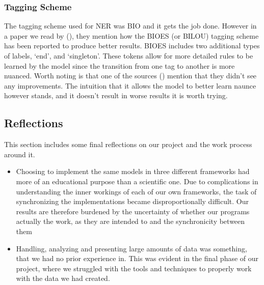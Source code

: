 \subsubsection{Tagging Scheme}

The tagging scheme used for NER was BIO and it gets the job done. However in a
paper we read by (\cite{ma2016endtoend}), they mention how the BIOES (or BILOU)
tagging scheme has been reported to produce better results. BIOES includes two
additional types of labels, `end', and `singleton'. These tokens allow for more
detailed rules to be learned by the model since the transition from one tag to
another is more nuanced. Worth noting is that one of the sources
(\cite{lample2016neural}) mention that they didn't see any improvements. The
intuition that it allows the model to better learn naunce however stands, and it
doesn't result in worse results it is worth trying.

\subsection{Reflections}

This section includes some final reflections on our project and the work process
around it.

\begin{itemize}
    \item Choosing to implement the same models in three different frameworks
        had more of an educational purpose than a scientific one. Due to
        complications in understanding the inner workings of each of our own
        frameworks, the task of synchronizing the implementations became
        disproportionally difficult. Our results are therefore burdened by the
        uncertainty of whether our programs actually the work, as they are
        intended to and the synchronicity between them
    \item Handling, analyzing and presenting large amounts of data was
        something, that we had no prior experience in. This was evident in the
        final phase of our project, where we struggled with the tools and
        techniques to properly work with the data we had created.
\end{itemize}

\pagebreak
